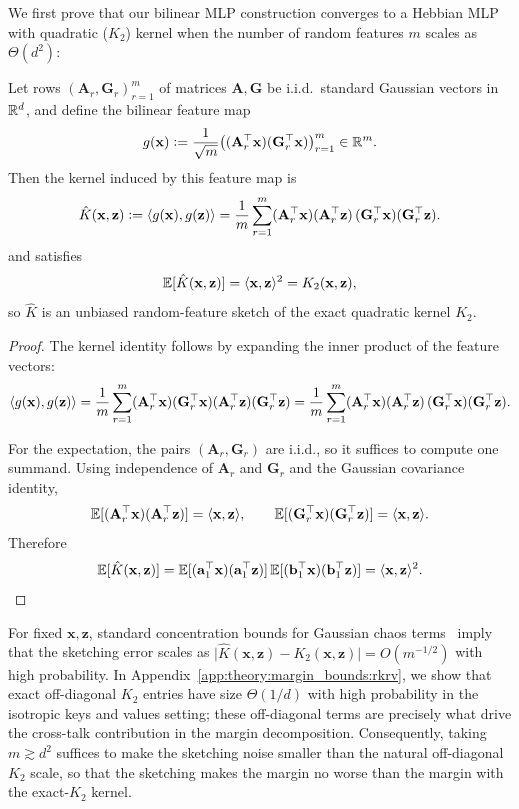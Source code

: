 We first prove that our bilinear MLP construction converges to a Hebbian MLP with quadratic ($K_{2}$) kernel when the number of random features $m$ scales as $\Theta(d^2)$:

\begin{lemma} \label{lem:bilinear-sketched-k2}
Let rows $(\mathbf{A}_{r},\mathbf{G}_{r})_{r=1}^m$ of matrices $\mathbf{A},\mathbf{G}$ be i.i.d.\ standard Gaussian vectors in $\mathbb{R}^d$, and define the
bilinear feature map
\[
g(\mathbf{x})
\vcentcolon=
\frac{1}{\sqrt m}\big((\mathbf{A}_{r}^\top \mathbf{x})(\mathbf{G}_{r}^\top \mathbf{x})\big)_{r=1}^m
\in \mathbb{R}^m.
\]
Then the kernel induced by this feature map is
\[
\hat K(\mathbf{x},\mathbf{z})
\vcentcolon=
\langle {g(\mathbf{x})}, {g(\mathbf{z})} \rangle
=
\frac{1}{m}\sum_{r=1}^m
(\mathbf{A}_{r}^\top \mathbf{x})(\mathbf{A}_{r}^\top \mathbf{z})\,
(\mathbf{G}_{r}^\top \mathbf{x})(\mathbf{G}_{r}^\top \mathbf{z}).
\]
and satisfies
\[
\mathbb{E}[\hat K(\mathbf{x},\mathbf{z})] = \langle {\mathbf{x}}, {\mathbf{z}} \rangle^2 = K_{2}(\mathbf{x},\mathbf{z}),
\]
so $\hat K$ is an unbiased random-feature sketch of the exact quadratic kernel $K_{2}$.
\end{lemma}

\begin{proof}
The kernel identity follows by expanding the inner product of the feature vectors:
\[
\langle {g(\mathbf{x})}, {g(\mathbf{z})} \rangle
=
\frac{1}{m}\sum_{r=1}^m
(\mathbf{A}_{r}^\top \mathbf{x})(\mathbf{G}_{r}^\top \mathbf{x})(\mathbf{A}_{r}^\top \mathbf{z})(\mathbf{G}_{r}^\top \mathbf{z})
=
\frac{1}{m}\sum_{r=1}^m
(\mathbf{A}_{r}^\top \mathbf{x})(\mathbf{A}_{r}^\top \mathbf{z})\,
(\mathbf{G}_{r}^\top \mathbf{x})(\mathbf{G}_{r}^\top \mathbf{z}).
\]

For the expectation, the pairs $(\mathbf{A}_{r},\mathbf{G}_{r})$ are i.i.d., so it suffices to compute one summand.
Using independence of $\mathbf{A}_{r}$ and $\mathbf{G}_{r}$ and the Gaussian covariance identity,
\[
\mathbb{E}[(\mathbf{A}_{r}^\top \mathbf{x})(\mathbf{A}_{r}^\top \mathbf{z})] = \langle {\mathbf{x}}, {\mathbf{z}} \rangle,
\qquad
\mathbb{E}[(\mathbf{G}_{r}^\top \mathbf{x})(\mathbf{G}_{r}^\top \mathbf{z})] = \langle {\mathbf{x}}, {\mathbf{z}} \rangle.
\]
Therefore
\[
\mathbb{E}[\hat K(\mathbf{x},\mathbf{z})]
=
\mathbb{E}[({\mathbf{a}}_{1}^\top \mathbf{x})({\mathbf{a}}_{1}^\top \mathbf{z})]\,
\mathbb{E}[({\mathbf{b}}_{1}^\top \mathbf{x})({\mathbf{b}}_{1}^\top \mathbf{z})]
=
\langle {\mathbf{x}}, {\mathbf{z}} \rangle^2.
\]
\end{proof}
For fixed $\mathbf{x},\mathbf{z}$, standard concentration bounds for Gaussian chaos terms~\citep{vershynin2018high} imply that the sketching error scales as $\bigl|\hat K(\mathbf{x},\mathbf{z})-K_{2}(\mathbf{x},\mathbf{z})\bigr| = O(m^{-1/2})$ with high probability.
In Appendix~\ref{app:theory:margin_bounds:rkrv}, we show that exact off-diagonal $K_{2}$ entries have size $\Theta(1/d)$ with high probability in the isotropic keys and values setting; these off-diagonal terms are precisely what drive the cross-talk contribution in the margin decomposition. Consequently, taking $m\gtrsim d^2$ suffices to make the sketching noise smaller than the natural off-diagonal $K_{2}$ scale, so that the sketching makes the margin no worse than the margin with the exact-$K_{2}$ kernel.
